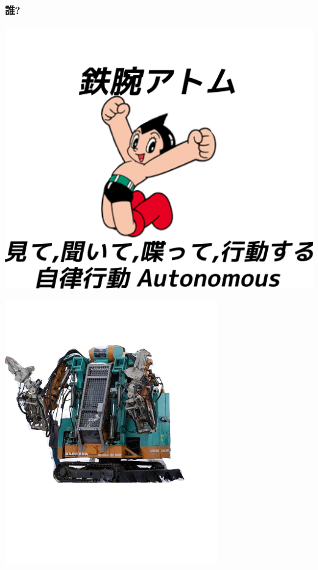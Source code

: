 \subsubsection{誰?}
\label{sec:orgheadline2}

\begin{container-fluid}
\begin{row-fluid}
\begin{span6}
\includegraphics{img/astro/final.png}
\end{span6}
\begin{span6}
\includegraphics{img/rescue/1.png}
\end{span6}
\end{row-fluid}
\begin{row-fluid}
\begin{span12}
\begin{xlarge}
　
\end{xlarge}
\end{span12}
\end{row-fluid}
\end{container-fluid}

